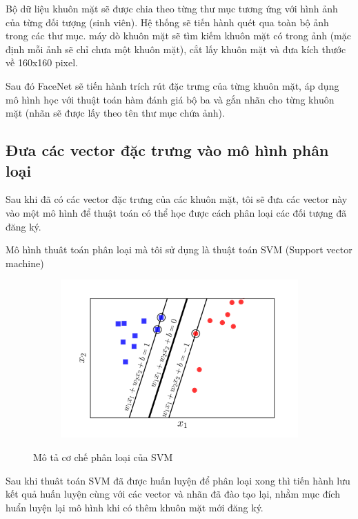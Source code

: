 Bộ dữ liệu khuôn mặt sẽ được chia theo từng thư mục tương ứng với hình ảnh
của từng đối tượng (sinh viên). Hệ thống sẽ tiến hành quét qua toàn bộ ảnh
trong các thư mục. máy dò khuôn mặt sẽ tìm kiếm khuôn mặt có
trong ảnh (mặc định mỗi ảnh sẽ chỉ chưa một khuôn mặt),
cắt lấy khuôn mặt và đưa kích thước về 160x160 pixel.




Sau đó FaceNet sẽ tiến hành trích rút đặc trưng của từng khuôn mặt,
áp dụng mô hình học với thuật toán hàm đánh giá bộ ba và gắn nhãn cho từng
khuôn mặt (nhãn sẽ được lấy theo tên thư mục chứa ảnh).

\newpage
\subsection{Đưa các vector đặc trưng vào mô hình phân loại}
Sau khi đã có các vector đặc trưng của các khuôn mặt, tôi sẽ đưa các vector này
vào một mô hình để thuật toán có thể học được cách phân loại các đối tượng đã đăng ký.


Mô hình thuât toán phân loại mà tôi sử dụng là thuật toán SVM (Support vector machine)

\begin{figure}
    \begin{subfigure}{0.8\textwidth}
        \includegraphics[width=1\linewidth]{Chapters/items/svm3.jpg}
        \label{fig:svm}
    \end{subfigure}
    \caption{Mô tả cơ chế phân loại của SVM}
\end{figure}

Sau khi thuât toán SVM đã được huấn luyện để phân loại xong thì tiến hành lưu kết quả huấn luyện cùng
với các vector và nhãn đã đào tạo lại, nhằm mục đích huẩn luyện lại mô hình khi có thêm khuôn mặt mới
đăng ký.



